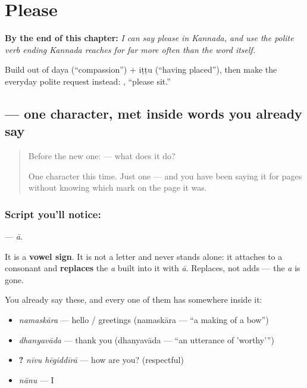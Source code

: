 
\chapter{Please}
\label{ch:ka-please}

\begin{chapteropening}
\textbf{By the end of this chapter:} \emph{I can say please in Kannada, and use the polite verb ending Kannada reaches for far more often than the word itself.}

Build  out of daya (\textquotedblleft{}compassion\textquotedblright{}) + iṭṭu (\textquotedblleft{}having placed\textquotedblright{}), then make the everyday polite request instead: , \textquotedblleft{}please sit.\textquotedblright{}
\end{chapteropening}

\section[\texorpdfstring{\kn{ಾ} (ā)}{ಾ (ā)}]{ — one character, met inside words you already say}

\label{lesson:KA-S08-vowel-sign-aa}



\begin{quote}
Before the new one:  — what does it do?

One character this time. Just one — and you have been saying it for pages without knowing which mark on the page it was.
\end{quote}

\subsection*{Script you'll notice: }
\textbf{} — \emph{ā}.

It is a \textbf{vowel sign}. It is not a letter and never stands alone: it attaches to a consonant and \textbf{replaces} the \emph{a} built into it with \emph{ā}. Replaces, not adds — the \emph{a} is gone.

You already say these, and every one of them has  somewhere inside it:

\begin{itemize}
\raggedright
  \item \textbf{} \emph{namaskāra} — hello / greetings (namaskāra — \textquotedblleft{}a making of a bow\textquotedblright{})
  \item \textbf{} \emph{dhanyavāda} — thank you (dhanyavāda — \textquotedblleft{}an utterance of 'worthy'\textquotedblright{})
  \item \textbf{ ?} \emph{nīvu hēgiddīrā} — how are you? (respectful)
  \item \textbf{} \emph{nānu} — I
\end{itemize}

